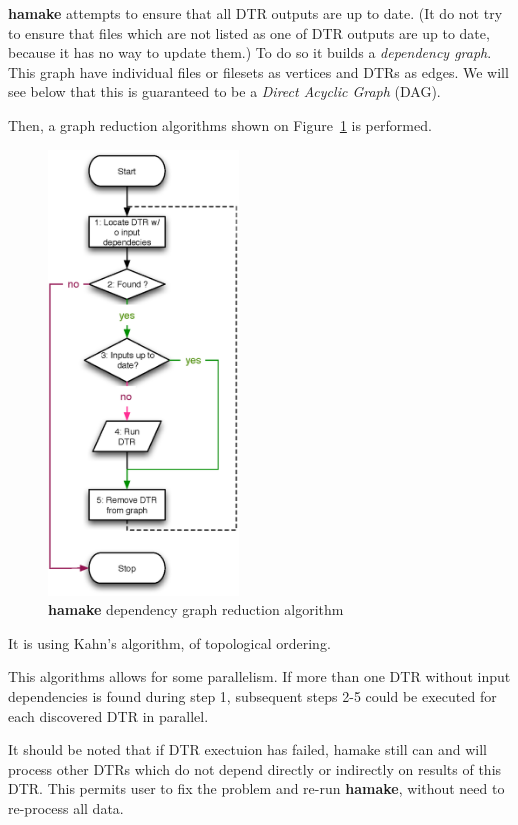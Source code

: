 \documentclass[10pt,conference,letterpaper]{IEEEtran}
\begin{document}
\textbf{hamake} attempts to ensure that all DTR outputs are up to
date. (It do not try to ensure that files which are not listed as one
of DTR outputs are up to date, because it has no way to update them.)
To do so it builds a \textit{dependency graph}. This graph have
individual files or filesets as vertices and DTRs as edges. We will
see below that this is guaranteed to be a \textit{Direct Acyclic
  Graph} (DAG).

Then, a graph reduction algorithms shown on Figure~\ref{fig:grred}
is performed.

\begin{figure}[htp]
\centering
\includegraphics[width=0.45\textwidth]{GraphReduction.eps}
\caption{\textbf{hamake} dependency graph reduction algorithm}
\label{fig:grred}
\end{figure}

It is using Kahn's algorithm\cite{kahn1962topological}, of topological
ordering\cite{wiki:topsort}.

This algorithms allows for some parallelism. If more than one DTR
without input dependencies is found during step 1, subsequent steps
2-5 could be executed for each discovered DTR in parallel.

It should be noted that if DTR exectuion has failed, hamake still can
and will process other DTRs which do not depend directly or indirectly
on results of this DTR. This permits user to fix the problem and
re-run \textbf{hamake}, without need to re-process all data.
\end{document}
